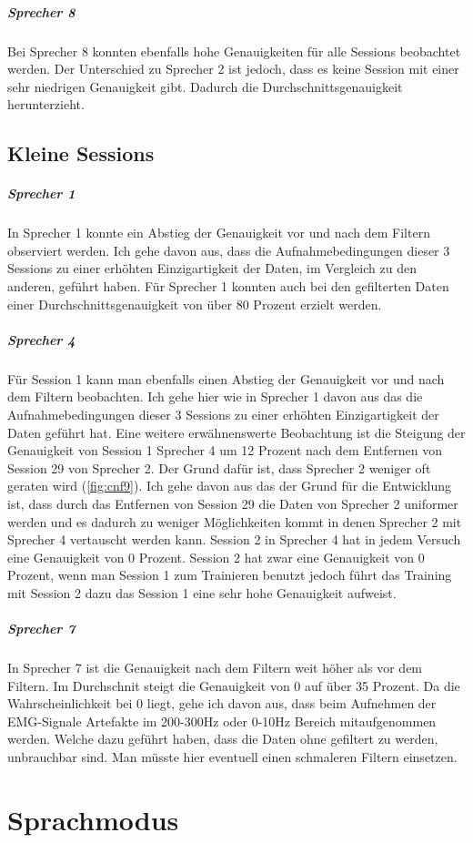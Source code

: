 \subparagraph{Sprecher 8}
Bei Sprecher 8 konnten ebenfalls hohe Genauigkeiten für alle Sessions beobachtet werden. Der Unterschied zu Sprecher 2 ist jedoch, dass es keine Session mit einer sehr niedrigen Genauigkeit gibt. Dadurch die Durchschnittsgenauigkeit herunterzieht.

\subsection{Kleine Sessions}
\subparagraph{Sprecher 1}
In Sprecher 1 konnte ein Abstieg der Genauigkeit vor und nach dem Filtern observiert werden. Ich gehe davon aus, dass die Aufnahmebedingungen dieser 3 Sessions zu einer erhöhten Einzigartigkeit der Daten, im Vergleich zu den anderen, geführt haben.
Für Sprecher 1 konnten auch bei den gefilterten Daten einer Durchschnittsgenauigkeit von über 80 Prozent erzielt werden.

\subparagraph{Sprecher 4}
Für Session 1 kann man ebenfalls einen Abstieg der Genauigkeit vor und nach dem Filtern  beobachten. Ich gehe hier wie in Sprecher 1 davon aus das die Aufnahmebedingungen dieser 3 Sessions zu einer erhöhten Einzigartigkeit der Daten geführt hat. Eine weitere erwähnenswerte Beobachtung ist die Steigung der Genauigkeit von Session 1 Sprecher 4 um 12 Prozent nach dem Entfernen von Session 29 von Sprecher 2. Der Grund dafür ist, dass Sprecher 2 weniger oft geraten wird (\ref{fig:cnf9}). Ich gehe davon aus das der Grund für die Entwicklung ist, dass durch das Entfernen von Session 29 die Daten von Sprecher 2 uniformer werden und es dadurch zu weniger Möglichkeiten kommt in denen Sprecher 2 mit Sprecher 4 vertauscht werden kann.
Session 2 in Sprecher 4 hat in jedem Versuch eine Genauigkeit von 0 Prozent. Session 2 hat zwar eine Genauigkeit von 0 Prozent, wenn man Session 1 zum Trainieren benutzt jedoch führt das Training mit Session 2 dazu das Session 1 eine sehr hohe Genauigkeit aufweist.

\subparagraph{Sprecher 7}
In Sprecher 7 ist die Genauigkeit nach dem Filtern weit höher als vor dem Filtern. Im Durchschnit steigt die Genauigkeit von 0 auf über 35 Prozent. Da die Wahrscheinlichkeit bei 0 liegt, gehe ich davon aus, dass beim Aufnehmen der EMG-Signale Artefakte im 200-300Hz oder 0-10Hz Bereich mitaufgenommen werden. Welche dazu geführt haben, dass die Daten ohne gefiltert zu werden, unbrauchbar sind. Man müsste hier eventuell einen schmaleren Filtern einsetzen.
\clearpage

\section{Sprachmodus}
